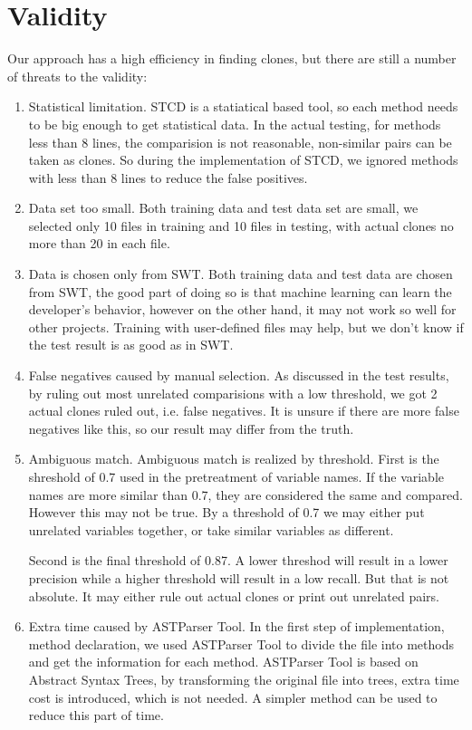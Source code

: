 \documentclass[../main.tex]{subfiles}
\begin{document}
\section{Validity}

Our approach has a high efficiency in finding clones, but there are still a number of threats to the validity:

\begin{enumerate}
\item Statistical limitation. STCD is a statiatical based tool, so each method needs to be big enough to get statistical data. In the actual testing, for methods less than 8 lines, the comparision is not reasonable, non-similar pairs can be taken as clones. So during the implementation of STCD, we ignored methods with less than 8 lines to reduce the false positives.

\item Data set too small. Both training data and test data set are small, we selected only 10 files in training and 10 files in testing, with actual clones no more than 20 in each file. 

\item Data is chosen only from SWT. Both training data and test data are chosen from SWT, the good part of doing so is that machine learning can learn the developer's behavior, however on the other hand, it may not work so well for other projects. Training with user-defined files may help, but we don't know if the test result is as good as in SWT.

\item False negatives caused by manual selection. As discussed in the test results, by ruling out most unrelated comparisions with a low threshold, we got 2 actual clones ruled out, i.e. false negatives. It is unsure if there are more false negatives like this, so our result may differ from the truth.

\item Ambiguous match. Ambiguous match is realized by threshold. First is the shreshold of 0.7 used in the pretreatment of variable names. If the variable names are more similar than 0.7, they are considered the same and compared. However this may not be true. By a threshold of 0.7 we may either put unrelated variables together, or take similar variables as different.

Second is the final threshold of 0.87. A lower threshod will result in a lower precision while a higher threshold will result in a low recall. But that is not absolute. It may either rule out actual clones or print out unrelated pairs.

\item Extra time caused by ASTParser Tool. In the first step of implementation, method declaration, we used ASTParser Tool to divide the file into methods and get the information for each method. ASTParser Tool is based on Abstract Syntax Trees, by transforming the original file into trees, extra time cost is introduced, which is not needed. A simpler method can be used to reduce this part of time.
\end{enumerate}
\end{document}
